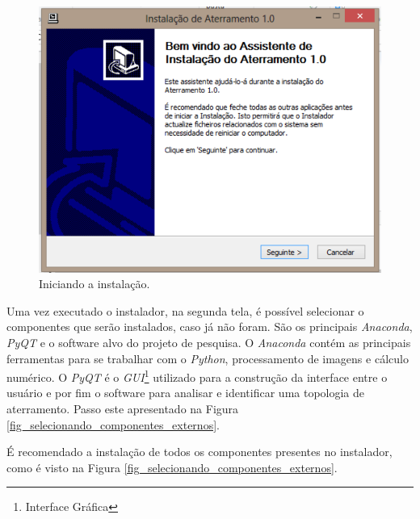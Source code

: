 \documentclass[a4paper, 10pt]{article}
\begin{document}
\begin{figure}[!h]
        \caption{\label{fig_iniciando_instalacao}Iniciando a instalação.}
	    \begin{center}
            \includegraphics[scale=0.7]{../fotos/instalacao/parte1_executando.pdf}
	    \end{center}
\end{figure}

Uma vez executado o instalador, na segunda tela, é possível selecionar o componentes 
que serão instalados, caso já não foram. São os principais \textit{Anaconda}, \textit{PyQT} e o software
alvo do projeto de pesquisa. O \textit{Anaconda} contém as principais ferramentas para se
trabalhar com o \textit{Python}, processamento de imagens e cálculo numérico. O \textit{PyQT} é 
o \textit{GUI}\footnote{Interface Gráfica} utilizado para a construção da interface entre o usuário e por fim 
o software para analisar e identificar uma topologia de aterramento. Passo este apresentado 
na Figura \ref{fig_selecionando_componentes_externos}. 

É recomendado a instalação  de todos os componentes presentes no instalador, como é 
visto na Figura \ref{fig_selecionando_componentes_externos}. 
\end{document}
